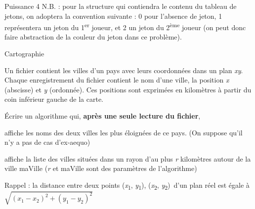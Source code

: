 \begin{Exercice}{Puissance 4}
	N.B. : pour la structure qui contiendra le contenu du tableau de jetons,
	on adoptera la convention suivante : 0 pour l’absence de jeton, 1
	représentera un jeton du 1\textsuperscript{er} joueur, et 2 un jeton du
	2\textsuperscript{ème} joueur (on peut donc faire abstraction de la
	couleur du jeton dans ce problème).
\end{Exercice}

\begin{Exercice}{Cartographie}

	Un fichier  contient les villes d’un pays avec
	leurs coordonnées dans un plan
	\textit{xy}. Chaque
	enregistrement du fichier contient le nom d’une ville, la position
	\textit{x} (abscisse) et
	\textit{y} (ordonnée). Ces
	positions sont exprimées en kilomètres à partir du coin inférieur
	gauche de la carte.

	Écrire un algorithme qui,
	\textbf{après une seule lecture du
	fichier}, 

	\begin{liste}
		\item
			affiche les noms des deux villes les plus éloignées de ce pays. (On
			suppose qu’il n’y a pas de cas d’ex-aequo)
		\item 
			affiche la liste des villes situées dans un rayon d’au
			plus \textit{r} kilomètres autour
			de la ville maVille
			(\textit{r} et maVille sont des
			paramètres de l’algorithme)
	\end{liste}
	
	Rappel : la distance entre deux
	points
	(\textit{x}\textsubscript{1},
	\textit{y}\textsubscript{1}),
	(\textit{x}\textsubscript{2},
	\textit{y}\textsubscript{2})~d’un
	plan réel est égale à
	\\
	\begin{math}
		\sqrt{{(x_1 - x_2)}^2 + {(y_1 - y_2)}^2}
	\end{math}
\end{Exercice}

